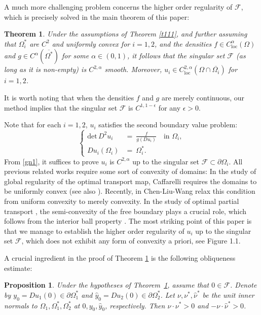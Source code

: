\documentclass[11pt]{amsart}
\theoremstyle{plain}
\newtheorem{theorem}{Theorem}[section]
\newtheorem{proposition}{Proposition}[section]
\renewcommand{\det}{\mbox{det}}
\newcommand{\0}{\textbf{0}}
\numberwithin{equation}{section}
\numberwithin{equation}{section}
\numberwithin{figure}{section}
\begin{document}
\vskip5pt
A much more challenging problem concerns the higher order regularity of $\mathcal{F}$, which is precisely solved in the main theorem of this paper:
\begin{theorem}\label{main1}
Under the assumptions of Theorem \ref{t111}, and further assuming that $\Omega^*_i$ are $C^2$ and uniformly convex for $i=1,2$, and the densities $f\in C_{\text{loc}}^\alpha(\Omega)$ and $g \in C^\alpha(\overline{\Omega^*})$ for some $\alpha\in(0,1)$, it follows that the singular set $\mathcal{F}$  (as long as it is non-empty) is $C^{2,\alpha}$ smooth. Moreover, $u_i \in C_{\text{loc}}^{2,\alpha}(\Omega \cap \overline{\Omega_i})$ for $i = 1, 2$.
\end{theorem}

It is worth noting that when the densities $f$ and $g$ are merely continuous, our method implies that the singular set $\mathcal{F}$ is $C^{1,1-\epsilon}$ for any $\epsilon>0$. 


Note that for each $i=1,2$, $u_i$ satisfies the second boundary value problem:
\begin{equation*}
\left\{ 
\begin{array}{rl}
  \det\, D^2 u_i \!\!&= \ \frac{f}{g(D u_i)} \quad \text{in } \Omega_i, \\
  D u_i(\Omega_i) \!\!&= \ \Omega^*_i.
\end{array}
\right.
\end{equation*} 
From \eqref{gn1}, it suffices to prove $u_i$ is $C^{2,\alpha}$ up to the singular set $\mathcal{F} \subset \partial \Omega_i$. 
All previous related works require some sort of convexity of domains: In the study of global regularity of the optimal transport map, Caffarelli \cite{C96} requires the domains to be uniformly convex (see also \cite{D91, U1}). Recently, in \cite{CLW1} Chen-Liu-Wang relax this condition from uniform convexity to merely convexity. In the study of optimal partial transport \cite{CLW3}, the semi-convexity of the free boundary plays a crucial role, which follows from the interior ball property \cite{CM,AF09,AFi}. 
The most striking point of this paper is that we manage to establish the higher order regularity of \( u_i \) up to the singular set \( \mathcal{F} \), which does not exhibit any form of convexity a priori, see Figure 1.1.

A crucial ingredient in the proof of Theorem \ref{main1} is the following obliqueness estimate:
\begin{proposition}\label{uniob}
Under the hypotheses of Theorem~\ref{main1}, assume that $0 \in \mathcal{F}$. Denote by $y_0 = Du_1(0) \in \partial\Omega^*_1$ and $\hat{y}_0 = Du_2(0) \in \partial\Omega^*_2$. Let $\nu, \nu^*, \hat{\nu}^*$ be the unit inner normals to $\Omega_1, \Omega_1^*, \Omega_2^*$ at $0, y_0, \hat{y}_0$, respectively. Then $\nu \cdot \nu^* > 0$ and $-\nu \cdot \hat{\nu}^* > 0$.
\end{proposition}
\end{document}
